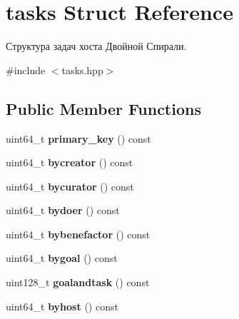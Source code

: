 \hypertarget{structtasks}{}\section{tasks Struct Reference}
\label{structtasks}


Структура задач хоста Двойной Спирали.  




{\ttfamily \#include $<$tasks.\+hpp$>$}

\subsection*{Public Member Functions}
\begin{DoxyCompactItemize}
\item 
\mbox{\label{structtasks_aeaa5ac6f325d5b6935371bcf755cfa86}} 
uint64\+\_\+t {\bfseries primary\+\_\+key} () const
\item 
\mbox{\label{structtasks_ad22f7c4144514d643e926903ef620ddd}} 
uint64\+\_\+t {\bfseries bycreator} () const
\item 
\mbox{\label{structtasks_a7890689f0ecd517df7bb7af23319a8e3}} 
uint64\+\_\+t {\bfseries bycurator} () const
\item 
\mbox{\label{structtasks_a0125dc5f9292e640868c22656dc3d223}} 
uint64\+\_\+t {\bfseries bydoer} () const
\item 
\mbox{\label{structtasks_a69b20ca043c8647069901e3502663e09}} 
uint64\+\_\+t {\bfseries bybenefactor} () const
\item 
\mbox{\label{structtasks_a8e8f40da24535f25d0de8c3f7b99f5a7}} 
uint64\+\_\+t {\bfseries bygoal} () const
\item 
\mbox{\label{structtasks_a19e89234fbbec30d0358446e8e5c7360}} 
uint128\+\_\+t {\bfseries goalandtask} () const
\item 
\mbox{\label{structtasks_a40ece529ad989cfbc7c8930a102e37e6}} 
uint64\+\_\+t {\bfseries byhost} () const
\item 
\mbox{\label{structtasks_aa51c0c51b966fa5274a4249246573650}} 

\end{DoxyCompactItemize}
